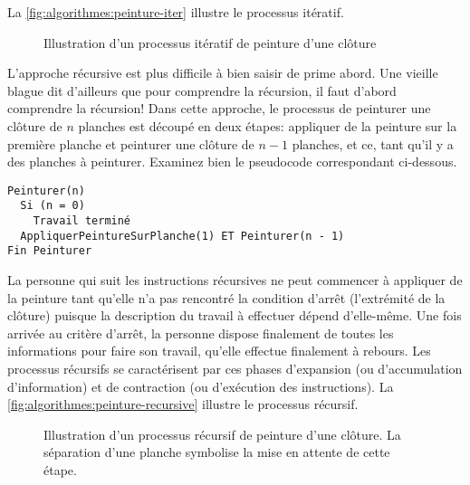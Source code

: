 La \autoref{fig:algorithmes:peinture-iter} illustre le processus itératif.

\begin{figure}
  \centering
  \setlength{\unitlength}{0.99mm}
  
  
  
  \caption{Illustration d'un processus itératif de peinture d'une
    clôture}
  \label{fig:algorithmes:peinture-iter}
\end{figure}

L'approche récursive est plus difficile à bien saisir de prime abord.
Une vieille blague dit d'ailleurs que pour comprendre la récursion, il
faut d'abord comprendre la récursion! Dans cette approche, le
processus de peinturer une clôture de $n$ planches est découpé en deux
étapes: appliquer de la peinture sur la première planche et peinturer
une clôture de $n - 1$ planches, et ce, tant qu'il y a des planches à
peinturer. Examinez bien le pseudocode correspondant ci-dessous.
\begin{Schunk}
\begin{Verbatim}
Peinturer(n)
  Si (n = 0)
    Travail terminé
  AppliquerPeintureSurPlanche(1) ET Peinturer(n - 1)
Fin Peinturer
\end{Verbatim}
\end{Schunk}

La personne qui suit les instructions récursives ne peut commencer à
appliquer de la peinture tant qu'elle n'a pas rencontré la condition
d'arrêt (l'extrémité de la clôture) puisque la description du travail
à effectuer dépend d'elle-même. Une fois arrivée au critère d'arrêt,
la personne dispose finalement de toutes les informations pour faire
son travail, qu'elle effectue finalement à rebours. Les processus
récursifs se caractérisent par ces phases d'expansion
(ou d'accumulation d'information) et de contraction
(ou d'exécution des instructions). La
\autoref{fig:algorithmes:peinture-recursive} illustre le processus
récursif.

\begin{figure}
  \centering
  \setlength{\unitlength}{0.99mm}
  
  
  \caption[Illustration d'un processus récursif de peinture d'une
  clôture]{Illustration d'un processus récursif de peinture d'une
    clôture. La séparation d'une planche symbolise la mise en attente
    de cette étape.}
  \label{fig:algorithmes:peinture-recursive}
\end{figure}

